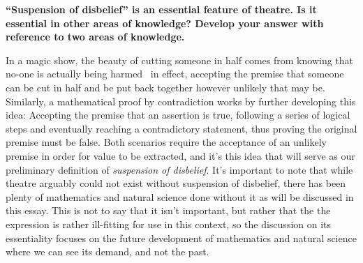 \textbf{“Suspension of disbelief” is an essential feature of theatre. Is it essential in other areas of knowledge? Develop your answer with reference to two areas of knowledge.}

In a magic show, the beauty of cutting someone in half comes from knowing that no-one is actually being harmed \textendash\ in effect, accepting the premise that someone can be cut in half and be put back together however unlikely that may be. Similarly, a mathematical proof by contradiction works by further developing this idea: Accepting the premise that an assertion is true, following a series of logical steps and eventually reaching a contradictory statement, thus proving the original premise must be false. Both scenarios require the acceptance of an unlikely premise in order for value to be extracted, and it's this idea that will serve as our preliminary definition of \textit{suspension of disbelief}. It's important to note that while theatre arguably could not exist without suspension of disbelief, there has been plenty of mathematics and natural science done without it as will be discussed in this essay. This is not to say that it isn't important, but rather that the the expression is rather ill-fitting for use in this context, so the discussion on its essentiality focuses on the future development of mathematics and natural science where we can see its demand, and not the past.

